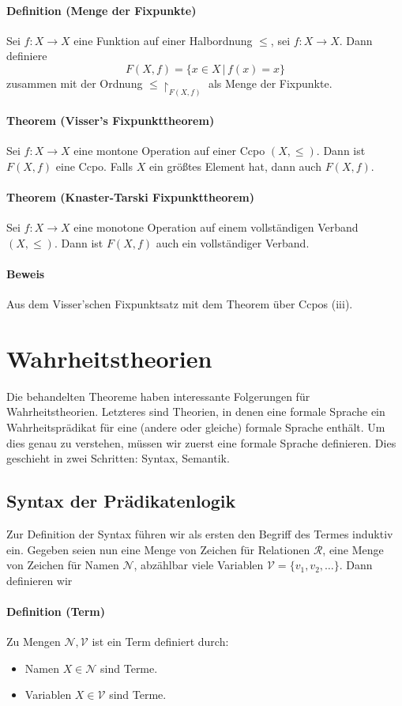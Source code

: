 \documentclass[a4paper,11pt,abstracton]{scrartcl}
\begin{document}
\paragraph{Definition (Menge der Fixpunkte)} Sei $f\colon X \to X$ eine Funktion auf einer Halbordnung $\leq$, sei $f\colon X \to X$. Dann definiere
\begin{equation}
 F(X,f) = \{ x \in X \, | \, f(x) = x \}
\end{equation}
zusammen mit der Ordnung $\leq \upharpoonright_{F(X,f)}$ als Menge der Fixpunkte.
\paragraph{Theorem (Visser's Fixpunkttheorem)} Sei $f\colon X \to X$ eine montone Operation auf einer Ccpo $(X, \leq)$. Dann ist $F(X,f)$ eine Ccpo. Falls $X$ ein größtes Element hat, dann auch $F(X,f)$.
\paragraph{Theorem (Knaster-Tarski Fixpunkttheorem)} Sei $f\colon X \to X$ eine monotone Operation auf einem vollständigen Verband $(X, \leq)$. Dann ist $F(X,f)$ auch ein vollständiger Verband.
\paragraph{Beweis} Aus dem Visser'schen Fixpunktsatz mit dem Theorem über Ccpos (iii).
\section{Wahrheitstheorien}
Die behandelten Theoreme haben interessante Folgerungen für Wahrheitstheorien. Letzteres sind Theorien, in denen eine formale Sprache ein Wahrheitsprädikat für eine (andere oder gleiche) formale Sprache enthält. Um dies genau zu verstehen, müssen wir zuerst eine formale Sprache definieren. Dies geschieht in zwei Schritten: Syntax, Semantik.
\subsection{Syntax der Prädikatenlogik}
Zur Definition der Syntax führen wir als ersten den Begriff des Termes induktiv ein. Gegeben seien nun eine Menge von Zeichen für Relationen $\mathcal{R}$, eine Menge von Zeichen für Namen $\mathcal{N}$, abzählbar viele Variablen $\mathcal{V}=\{ v_1, v_2, \dots \}$. Dann definieren wir
\paragraph{Definition (Term)} Zu Mengen $\mathcal{N}, \mathcal{V}$ ist ein Term definiert durch:
\begin{itemize}
 \item Namen $X \in \mathcal{N}$ sind Terme.
 \item Variablen $X \in \mathcal{V}$ sind Terme.
\end{itemize}
\end{document}
